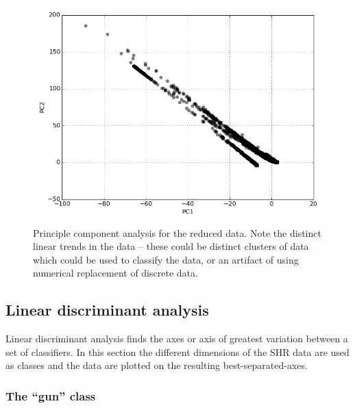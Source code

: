\begin{multicols}{2}
\begin{figure}[H]
  \centering
    \includegraphics[width=\linewidth]{images/PCA.png}
  \caption{Principle component analysis for the reduced data.  Note the distinct linear trends in the data -- these could be distinct clusters of data which could be used to classify the data, or an artifact of using numerical replacement of discrete data.}
\end{figure}

\subsection{Linear discriminant analysis}

Linear discriminant analysis finds the axes or axis of greatest variation between a set of classifiers.  In this section the different dimensions of the SHR data are used as classes and the data are plotted on the resulting best-separated-axes.

\subsubsection{The ``gun'' class}


\end{multicols}
